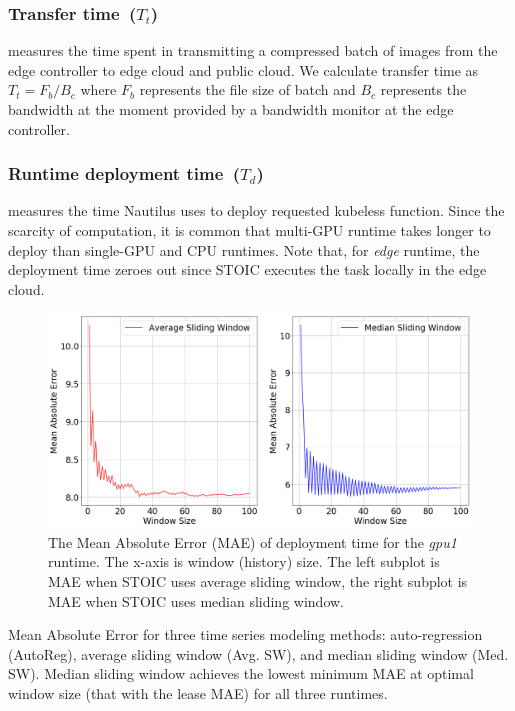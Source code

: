  \subsubsection{Transfer time~($T_t$)} measures the time spent in transmitting a compressed batch of images from the edge controller to edge cloud and public cloud. We calculate transfer time as ${T_t = F_b / B_c}$ where $F_b$ represents the file size of batch and $B_c$ represents the bandwidth at the moment provided by a bandwidth monitor at the edge controller. 
 
 \subsubsection{Runtime deployment time~($T_d$)} measures the time Nautilus uses to deploy requested kubeless function. Since the scarcity of computation, it is common that multi-GPU runtime takes longer to deploy than single-GPU and CPU runtimes. Note that, for \textit{edge} runtime, the deployment time zeroes out since STOIC executes the task locally in the edge cloud.
 
\begin{figure}
    \centering
    \includegraphics[scale=0.21]{figures/deployment}
    \caption{The Mean Absolute Error (MAE) of deployment time for the \textit{gpu1} runtime. The x-axis is window (history) size. The left subplot is MAE when STOIC uses average sliding window, the right subplot is MAE when STOIC uses median sliding window.
\label{fig:deployment}}
\end{figure}

 
\begin{table}
\centering

\caption{Mean Absolute Error for three time series modeling methods: auto-regression (AutoReg), average sliding window (Avg. SW), and median sliding window (Med. SW). Median sliding window achieves the lowest minimum MAE at optimal window size (that with the lease MAE) for all three runtimes. \label{tab:deployment}}
\end{table}
 

